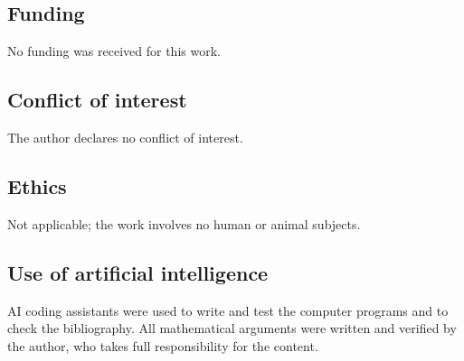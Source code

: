 \documentclass[11pt]{amsart}
\theoremstyle{definition}
\theoremstyle{remark}
\begin{document}
\subsection*{Funding} No funding was received for this work.

\subsection*{Conflict of interest} The author declares no conflict of interest.

\subsection*{Ethics} Not applicable; the work involves no human or animal subjects.

\subsection*{Use of artificial intelligence} AI coding assistants were used to write and test the computer programs and to check the bibliography. All mathematical arguments were written and verified by the author, who takes full responsibility for the content.
\end{document}
